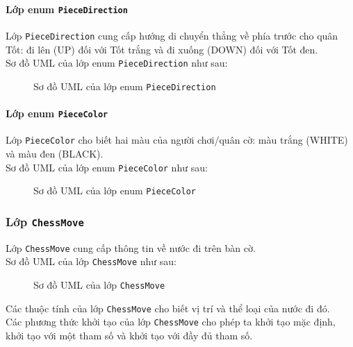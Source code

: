 \paragraph{Lớp enum \lstinline{PieceDirection}}
Lớp \lstinline{PieceDirection} cung cấp hướng di chuyển thẳng về phía trước cho quân Tốt: đi lên (UP) đối với Tốt trắng và đi xuống (DOWN) đối với Tốt đen.\\
Sơ đồ UML của lớp enum \lstinline{PieceDirection} như sau:
\begin{figure}[H]
\caption{Sơ đồ UML của lớp enum \lstinline{PieceDirection}}
\end{figure}
\paragraph{Lớp enum \lstinline{PieceColor}}
Lớp \lstinline{PieceColor} cho biết hai màu của người chơi/quân cờ: màu trắng (WHITE) và màu đen (BLACK).\\
Sơ đồ UML của lớp enum \lstinline{PieceColor} như sau:
\begin{figure}[H]
\caption{Sơ đồ UML của lớp enum \lstinline{PieceColor}}
\end{figure}
\subsubsection{Lớp \lstinline{ChessMove}}
Lớp \lstinline{ChessMove} cung cấp thông tin về nước đi trên bàn cờ.\\
Sơ đồ UML của lớp \lstinline{ChessMove} như sau:
\begin{figure}[H]
\caption{Sơ đồ UML của lớp \lstinline{ChessMove}}
\end{figure}
Các thuộc tính của lớp \lstinline{ChessMove} cho biết vị trí và thể loại của nước đi đó.\\
Các phương thức khởi tạo của lớp \lstinline{ChessMove} cho phép ta khởi tạo mặc định, khởi tạo với một tham số và khởi tạo với đầy đủ tham số.
